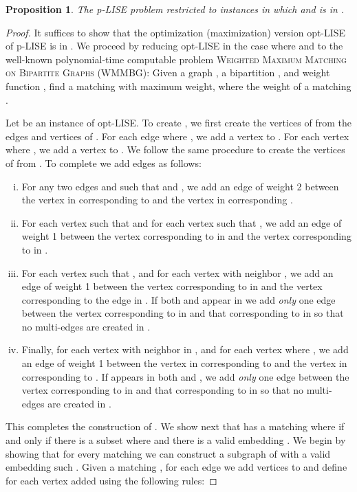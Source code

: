 \documentclass[11pt]{article}
\newtheorem{proposition}[theorem]{Proposition}
\begin{document}
\begin{proposition}\label{prop:unordered_is_in_P}
The p-LISE problem restricted to instances in which  and  is in .
\end{proposition}

\begin{proof}
It suffices to show that the optimization (maximization) version opt-LISE of p-LISE is in . We proceed by reducing opt-LISE in the case where  and  to the well-known polynomial-time computable problem \textsc{Weighted Maximum Matching on Bipartite Graphs} (WMMBG):  Given a graph , a bipartition , and weight function , find a matching  with maximum weight, where the weight of a matching .

Let  be an instance of opt-LISE.  To create , we first create the vertices of  from the edges and vertices of .  For each edge  where , we add a vertex to .  For each vertex  where , we add a vertex to .  We follow the same procedure to create the vertices of  from .  To complete  we add edges as follows:

\begin{enumerate}[(i)]
 \item For any two edges  and  such that  and , we add an edge of weight 2 between the vertex in  corresponding to  and the vertex in  corresponding .
 \item For each vertex  such that  and for each vertex  such that , we add an edge of weight 1 between the vertex corresponding to  in  and the vertex corresponding to  in .

 \item For each vertex  such that , and for each vertex  with neighbor , we add an edge of weight 1 between the vertex corresponding to  in  and the vertex corresponding to the edge  in . If both  and  appear in  we add {\em only} one edge between the vertex corresponding to  in  and that corresponding to  in  so that no multi-edges are created in .

 \item Finally, for each vertex  with neighbor  in , and for each vertex  where , we add an edge of weight 1 between the vertex in  corresponding to  and the vertex in  corresponding to . If  appears in both  and , we add {\em only} one edge between the vertex corresponding to  in  and that corresponding to  in  so that no multi-edges are created in .
\end{enumerate}

This completes the construction of .  We show next that  has a matching  where  if and only if there is a subset  where  and there is a valid embedding .  We begin by showing that for every matching  we can construct a subgraph  of  with a valid embedding  such .  Given a matching , for each edge  we add vertices to  and define  for each vertex  added using the following rules:


\end{proof}
\end{document}
